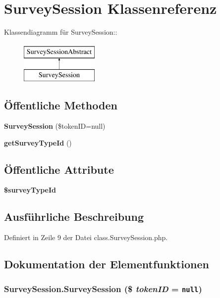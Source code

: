 \section{SurveySession Klassenreferenz}
\label{classSurveySession}
Klassendiagramm für SurveySession::\begin{figure}[H]
\begin{center}
\leavevmode
\includegraphics[height=2cm]{classSurveySession}
\end{center}
\end{figure}
\subsection*{Öffentliche Methoden}
\begin{CompactItemize}
\item 
{\bf SurveySession} (\$tokenID=null)
\item 
{\bf getSurveyTypeId} ()
\end{CompactItemize}
\subsection*{Öffentliche Attribute}
\begin{CompactItemize}
\item 
{\bf \$surveyTypeId}
\end{CompactItemize}


\subsection{Ausführliche Beschreibung}


Definiert in Zeile 9 der Datei class.SurveySession.php.

\subsection{Dokumentation der Elementfunktionen}
\subsubsection{\setlength{\rightskip}{0pt plus 5cm}SurveySession.SurveySession (\$ {\em tokenID} = {\tt null})}\label{classSurveySession_ad8c462d9c3b0a33d3a49ee9eee76dee}




